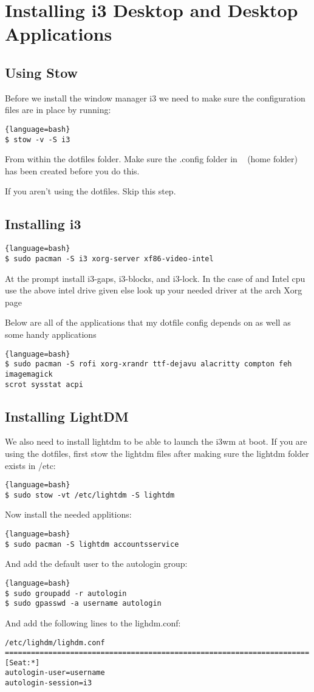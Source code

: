 
\section{Installing i3 Desktop and Desktop Applications}
\subsection{Using Stow}
Before we install the window manager i3 we need to make sure the configuration files are in place by running:
\begin{lstlisting}{language=bash}
$ stow -v -S i3
\end{lstlisting}
From within the dotfiles folder. Make sure the .config folder in ~ (home folder) has been created before you do this.

If you aren't using the dotfiles. Skip this step.


\subsection{Installing i3}
\begin{lstlisting}{language=bash}
$ sudo pacman -S i3 xorg-server xf86-video-intel 
\end{lstlisting}
At the prompt install i3-gaps, i3-blocks, and i3-lock.
In the case of and Intel cpu use the above intel drive given else look up your needed driver at the arch Xorg page

Below are all of the applications that my dotfile config depends on as well as some handy applications
\begin{lstlisting}{language=bash}
$ sudo pacman -S rofi xorg-xrandr ttf-dejavu alacritty compton feh imagemagick
scrot sysstat acpi
\end{lstlisting}


\subsection{Installing LightDM}
We also need to install lightdm to be able to launch the i3wm at boot.
If you are using the dotfiles, first stow the lightdm files after making sure the lightdm folder exists in /etc:
\begin{lstlisting}{language=bash}
$ sudo stow -vt /etc/lightdm -S lightdm
\end{lstlisting}
Now install the needed applitions:
\begin{lstlisting}{language=bash}
$ sudo pacman -S lightdm accountsservice
\end{lstlisting}
And add the default user to the autologin group:
\begin{lstlisting}{language=bash}
$ sudo groupadd -r autologin
$ sudo gpasswd -a username autologin
\end{lstlisting}
And add the following lines to the lighdm.conf:
\begin{verbatim}
/etc/lighdm/lighdm.conf
======================================================================
[Seat:*]
autologin-user=username
autologin-session=i3
\end{verbatim}


